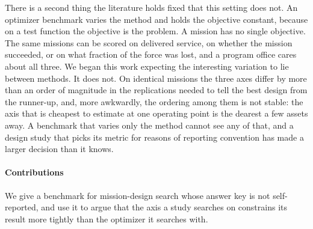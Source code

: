 \documentclass[11pt]{article}
\begin{document}
There is a second thing the literature holds fixed that this setting does not. An optimizer benchmark
varies the method and holds the objective constant, because on a test function the objective is the
problem. A mission has no single objective. The same missions can be scored on delivered service, on
whether the mission succeeded, or on what fraction of the force was lost, and a program office cares
about all three. We began this work expecting the interesting variation to lie between methods. It
does not. On identical missions the three axes differ by more than an order of magnitude in the
replications needed to tell the best design from the runner-up, and, more awkwardly, the ordering
among them is not stable: the axis that is cheapest to estimate at one operating point is the
dearest a few assets away. A benchmark that varies only the method cannot see any of that, and a
design study that picks its metric for reasons of reporting convention has made a larger decision
than it knows.

\paragraph{Contributions} We give a benchmark for mission-design search whose answer key is not
self-reported, and use it to argue that the axis a study searches on constrains its result more
tightly than the optimizer it searches with.
\end{document}
